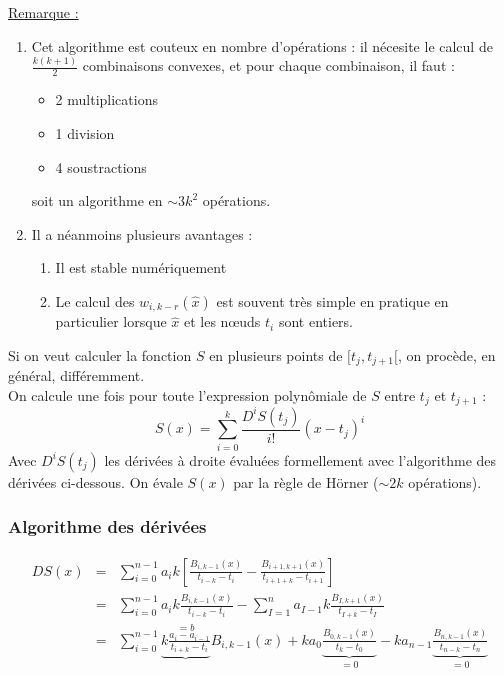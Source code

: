 \bigskip
\underline{Remarque :} \begin{enumerate}
	\item Cet algorithme est couteux en nombre d'opérations : il nécesite le calcul de $\frac{k(k+1)}{2}$ combinaisons convexes, et pour chaque combinaison, il faut :
	\begin{itemize}
		\item 2 multiplications
		\item 1 division
		\item 4 soustractions
	\end{itemize}
	soit un algorithme en $\sim3k^2$ opérations.
	\item Il a néanmoins plusieurs avantages : \begin{enumerate}
		\item Il est stable numériquement
		\item Le calcul des $w_{i,k-r}(\hat{x})$ est souvent très simple en pratique en particulier lorsque $\hat{x}$ et les n\oe uds $t_i$ sont entiers.
	\end{enumerate}
\end{enumerate}

Si on veut calculer la fonction $S$ en plusieurs points de $[t_j, t_{j+1}[$, on procède, en général, différemment.\\
On calcule une fois pour toute l'expression polynômiale de $S$ entre $t_j$ et $t_{j+1}$ :
	\[S(x)=\sum_{i=0}^k \frac{D^iS(t_j)}{i!} (x-t_j)^i\]
Avec $D^iS(t_j)$ les dérivées à droite évaluées formellement avec l'algorithme des dérivées ci-dessous. On évale $S(x)$ par la règle de Hörner ($\sim2k$ opérations).

\subsubsection{Algorithme des dérivées}

\begin{dem}
\begin{eqnarray*}
DS(x)&=&\sum_{i=0}^{n-1} a_i k \left[\frac{B_{i,k-1}(x)}{t_{i-k}-t_i} - \frac{B_{i+1,k+1}(x)}{t_{i+1+k}-t_{i+1}} \right] \\
	&=&\sum_{i=0}^{n-1} a_i k \frac{B_{i,k-1}(x)}{t_{i-k}-t_i} - \sum_{I=1}^{n}a_{I-1} k \frac{B_{I,k+1}(x)}{t_{I+k}-t_{I}}\\
	&=&\sum_{i=0}^{n-1} \underbrace{k \frac{a_i-a_{i-1}}{t_{i+k}-t_i}}^{=b} B_{i,k-1}(x) + ka_0\underbrace{\frac{B_{0,k-1}(x)}{t_k-t_0}}_{=0} - ka_{n-1}\underbrace{\frac{B_{n,k-1}(x)}{t_{n-k}-t_n}}_{=0}
\end{eqnarray*}
\end{dem}

